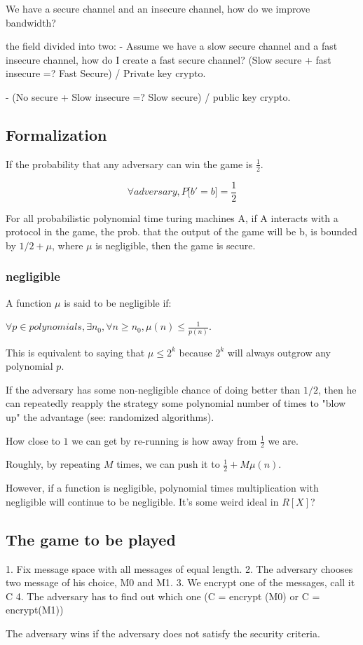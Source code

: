 We have a secure channel and an insecure channel, how do we improve 
bandwidth?

the field divided into two:
- Assume we have a slow secure channel and a fast insecure channel, how do I create
a fast secure channel? (Slow secure + fast insecure =? Fast Secure) / Private key crypto.

- (No secure + Slow insecure =? Slow secure) / public key crypto.

\subsection{Formalization}

If the probability that any adversary can win the game is $\frac{1}{2}$.

$$\forall adversary, P \lbrack b' = b \rbrack = \frac{1}{2}$$


For all probabilistic polynomial time turing machines A, if A interacts with a protocol in the game,
the prob. that the output of the game will be b, is bounded by $1 / 2 + \mu$, where $\mu$
is negligible, then the game is secure.


\subsubsection{negligible}
A function $\mu$ is said to be negligible if:


$\forall p \in polynomials, \exists n_0, \forall n \geq n_0, \mu(n) \leq \frac{1}{p(n)}$.

This is equivalent to saying that $\mu \leq 2^k$ because $2^k$ will always
outgrow any polynomial $p$.

If the adversary has some non-negligible chance of doing better than
$1 / 2$, then he can repeatedly reapply the strategy some polynomial number
of times to "blow up" the advantage (see: randomized algorithms).

How close to $1$ we can get by re-running is how away from $\frac{1}{2}$ we are.

Roughly, by repeating $M$ times, we can push it to $\frac{1}{2} + M \mu(n)$.


However, if a function is negligible, polynomial times multiplication with
negligible will continue to be negligible. It's some weird ideal in $R[X]$? 


\subsection{The game to be played}

1. Fix message space with all messages of equal length.
2. The adversary chooses two message of his choice, M0 and M1.
3. We encrypt one of the messages, call it C
4. The adversary has to find out which one (C = encrypt (M0) or C = encrypt(M1))

The adversary wins if  the adversary does not satisfy the security criteria.
